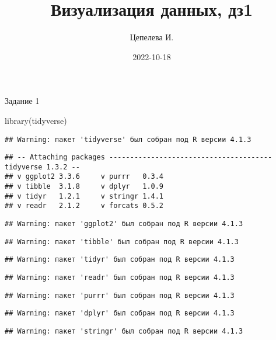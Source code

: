 \documentclass[
]{article}
\title{Визуализация данных, дз1}
\author{Цепелева И.}
\date{2022-10-18}
\newenvironment{Shaded}{\begin{snugshade}}{\end{snugshade}}
\newcommand{\FunctionTok}[1]{\textcolor[rgb]{0.00,0.00,0.00}{#1}}
\newcommand{\NormalTok}[1]{#1}
\begin{document}
\maketitle

Задание 1

\begin{Shaded}
\begin{Highlighting}[]
\FunctionTok{library}\NormalTok{(tidyverse)}
\end{Highlighting}
\end{Shaded}

\begin{verbatim}
## Warning: пакет 'tidyverse' был собран под R версии 4.1.3
\end{verbatim}

\begin{verbatim}
## -- Attaching packages --------------------------------------- tidyverse 1.3.2 --
## v ggplot2 3.3.6     v purrr   0.3.4
## v tibble  3.1.8     v dplyr   1.0.9
## v tidyr   1.2.1     v stringr 1.4.1
## v readr   2.1.2     v forcats 0.5.2
\end{verbatim}

\begin{verbatim}
## Warning: пакет 'ggplot2' был собран под R версии 4.1.3
\end{verbatim}

\begin{verbatim}
## Warning: пакет 'tibble' был собран под R версии 4.1.3
\end{verbatim}

\begin{verbatim}
## Warning: пакет 'tidyr' был собран под R версии 4.1.3
\end{verbatim}

\begin{verbatim}
## Warning: пакет 'readr' был собран под R версии 4.1.3
\end{verbatim}

\begin{verbatim}
## Warning: пакет 'purrr' был собран под R версии 4.1.3
\end{verbatim}

\begin{verbatim}
## Warning: пакет 'dplyr' был собран под R версии 4.1.3
\end{verbatim}

\begin{verbatim}
## Warning: пакет 'stringr' был собран под R версии 4.1.3
\end{verbatim}
\end{document}
